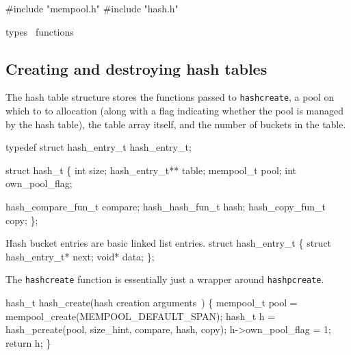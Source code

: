 #include "mempool.h"
#include "hash.h"

\LA{}types~{\nwtagstyle{}}\RA{}
\LA{}functions~{\nwtagstyle{}}\RA{}
\nwendcode{}\nwdocspar


\subsection{Creating and destroying hash tables}

The hash table structure stores the functions passed to {\tt{}hash{}create},
a pool on which to to allocation (along with a flag indicating whether
the pool is managed by the hash table), the table array itself, and
the number of buckets in the table.

\nwenddocs{}\endmoddef
typedef struct hash_entry_t hash_entry_t;

struct hash_t \{
    int             size;
    hash_entry_t**  table;
    mempool_t       pool;
    int             own_pool_flag;

    hash_compare_fun_t compare;
    hash_hash_fun_t    hash;
    hash_copy_fun_t    copy;
\};

\nwendcode{}\nwdocspar

Hash bucket entries are basic linked list entries.
\nwenddocs{}\plusendmoddef
struct hash_entry_t \{
    struct hash_entry_t* next;
    void* data;
\};

\nwendcode{}\nwdocspar

The {\tt{}hash{}create} function is essentially just a wrapper around
{\tt{}hash{}pcreate}.

\nwenddocs{}\endmoddef
hash_t hash_create(\LA{}hash creation arguments~{\nwtagstyle{}}\RA{})
\{
    mempool_t pool = mempool_create(MEMPOOL_DEFAULT_SPAN);
    hash_t    h    = hash_pcreate(pool, size_hint, compare, hash, copy);
    h->own_pool_flag = 1;
    return h;
\}

